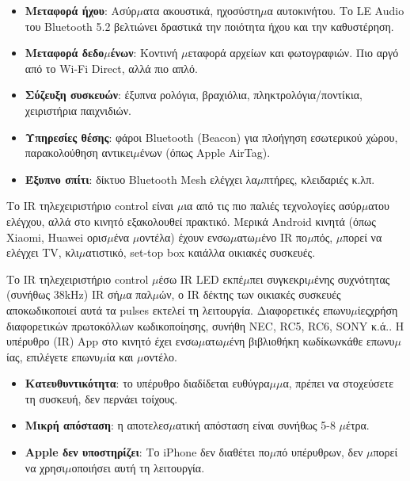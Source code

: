 \begin{itemize}
  \item \textbf{Μεταφορά ήχου}: Ασύρ$\mu$ατα ακουστικά, ηχοσύστη$\mu$α αυτοκινήτου. Το LE Audio του Bluetooth 5.2 βελτιώνει δραστικά την ποιότητα ήχου και την καθυστέρηση.
  \item \textbf{Μεταφορά δεδο$\mu$ένων}: Κοντινή $\mu$εταφορά αρχείων και φωτογραφιών. Πιο αργό από το Wi-Fi Direct, αλλά πιο απλό.
  \item \textbf{Σύζευξη συσκευών}: έξυπνα ρολόγια, βραχιόλια, πληκτρολόγια/ποντίκια, χειριστήρια παιχνιδιών.
  \item \textbf{Υπηρεσίες θέσης}: φάροι Bluetooth (Beacon) για πλοήγηση εσωτερικού χώρου, παρακολούθηση αντικει$\mu$ένων (όπως Apple AirTag).
  \item \textbf{Έξυπνο σπίτι}: δίκτυο Bluetooth Mesh ελέγχει λα$\mu$πτήρες, κλειδαριές κ.λπ.
\end{itemize}


Το IR τηλεχειριστήριο control είναι $\mu$ια από τις πιο παλιές τεχνολογίες ασύρ$\mu$ατου ελέγχου, αλλά στο κινητό εξακολουθεί πρακτικό. Μερικά Android κινητά (όπως Xiaomi, Huawei ορισ$\mu$ένα $\mu$οντέλα) έχουν ενσω$\mu$ατω$\mu$ένο IR πο$\mu$πός, $\mu$πορεί να ελέγχει TV, κλι$\mu$ατιστικό, set-top box καιάλλα οικιακές συσκευές.


Το IR τηλεχειριστήριο control $\mu$έσω IR LED εκπέ$\mu$πει συγκεκρι$\mu$ένης συχνότητας (συνήθως 38kHz) IR σή$\mu$α παλ$\mu$ών, ο IR δέκτης των οικιακές συσκευές αποκωδικοποιεί αυτά τα pulses εκτελεί τη λειτουργία. Διαφορετικές επωνυ$\mu$ίεςχρήση διαφορετικών πρωτοκόλλων κωδικοποίησης, συνήθη NEC, RC5, RC6, SONY κ.ά.. Η υπέρυθρο (IR) App στο κινητό έχει ενσω$\mu$ατω$\mu$ένη βιβλιοθήκη κωδίκωνκάθε επωνυ$\mu$ίας, επιλέγετε επωνυ$\mu$ία και $\mu$οντέλο.


\begin{itemize}
  \item \textbf{Κατευθυντικότητα}: το υπέρυθρο διαδίδεται ευθύγρα$\mu$$\mu$α, πρέπει να στοχεύσετε τη συσκευή, δεν περνάει τοίχους.
  \item \textbf{Μικρή απόσταση}: η αποτελεσ$\mu$ατική απόσταση είναι συνήθως 5-8 $\mu$έτρα.
  \item \textbf{Apple δεν υποστηρίζει}: Το iPhone δεν διαθέτει πο$\mu$πό υπέρυθρων, δεν $\mu$πορεί να χρησι$\mu$οποιήσει αυτή τη λειτουργία.
\end{itemize}

